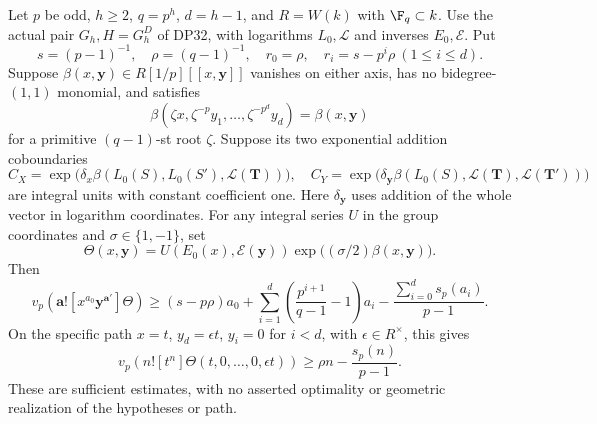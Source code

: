 \begin{proposition}\label{DP36}
Let $p$ be odd, $h\ge2$, $q=p^h$, $d=h-1$, and $R=W(k)$ with $\F_q\subset k$. Use the actual pair $G_h,H=G_h^D$ of DP32, with logarithms $L_0,\mathcal L$ and inverses $E_0,\mathcal E$. Put
\[
 s=(p-1)^{-1},\quad\rho=(q-1)^{-1},\quad r_0=\rho,\quad r_i=s-p^i\rho\ (1\le i\le d).
\]
Suppose $\beta(x,\mathbf y)\in R[1/p][[x,\mathbf y]]$ vanishes on either axis, has no bidegree-$(1,1)$ monomial, and satisfies
\[
 \beta(\zeta x,\zeta^{-p}y_1,\ldots,\zeta^{-p^d}y_d)=\beta(x,\mathbf y)
\]
for a primitive $(q-1)$-st root $\zeta$. Suppose its two exponential addition coboundaries
\[
 C_X=\exp\bigl(\delta_x\beta(L_0(S),L_0(S'),\mathcal L(\mathbf T))\bigr),\quad
 C_Y=\exp\bigl(\delta_{\mathbf y}\beta(L_0(S),\mathcal L(\mathbf T),\mathcal L(\mathbf T'))\bigr)
\]
are integral units with constant coefficient one. Here $\delta_{\mathbf y}$ uses addition of the whole vector in logarithm coordinates. For any integral series $U$ in the group coordinates and $\sigma\in\{1,-1\}$, set
\[
 \Theta(x,\mathbf y)=U(E_0(x),\mathcal E(\mathbf y))\exp\bigl((\sigma/2)\beta(x,\mathbf y)\bigr).
\]
Then
\begin{equation}\label{eq:true-pair-weight}
 v_p(\mathbf a![x^{a_0}\mathbf y^{\mathbf a'}]\Theta)
 \ge (s-p\rho)a_0+\sum_{i=1}^d\left(\frac{p^{i+1}}{q-1}-1\right)a_i
       -\frac{\sum_{i=0}^d s_p(a_i)}{p-1}.
\end{equation}
On the specific path $x=t$, $y_d=\epsilon t$, $y_i=0$ for $i<d$, with $\epsilon\in R^\times$, this gives
\begin{equation}\label{eq:true-pair-path}
 v_p(n![t^n]\Theta(t,0,\ldots,0,\epsilon t))
 \ge\rho n-\frac{s_p(n)}{p-1}.
\end{equation}
These are sufficient estimates, with no asserted optimality or geometric realization of the hypotheses or path.
\end{proposition}
